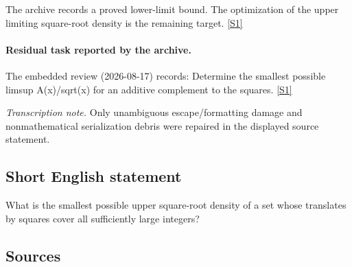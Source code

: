 \documentclass[11pt,a4paper]{article}
\newcommand{\sref}[2]{\hyperlink{source:#1:#2}{[S#2]}}
\begin{document}
The archive records a proved lower-limit bound. The optimization of the upper limiting square-root density is the remaining target. \sref{statement}{1}

\paragraph{Residual task reported by the archive.}

The embedded review (2026-08-17) records: Determine the smallest possible limsup A(x)/sqrt(x) for an additive complement to the squares. \sref{statement}{1}

{\small\emph{Transcription note.} Only unambiguous escape/formatting damage and nonmathematical serialization debris were repaired in the displayed source statement.}

\subsection{Short English statement}

What is the smallest possible upper square-root density of a set whose translates by squares cover all sufficiently large integers?

\subsection{Sources}
\end{document}

